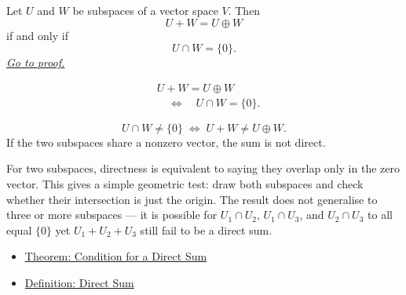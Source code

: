 
\begin{tcolorbox}[colback=thmbox, colframe=thmborder, arc=2pt,
  left=6pt, right=6pt, top=4pt, bottom=4pt,
  title={\small\textbf{Theorem (Direct Sum of Two Subspaces)}},
  fonttitle=\small\bfseries]
\begin{theorem}
\label{thm:direct-sum-of-two-subspaces}
Let $U$ and $W$ be subspaces of a vector space $V$.
Then
\[
U+W=U\oplus W
\]
if and only if
\[
U \cap W = \{0\}.
\]
\hyperref[prf:direct-sum-of-two-subspaces]{\textit{Go to proof.}}
\end{theorem}
\end{tcolorbox}

\begin{remark*}
\[
\begin{aligned}
&U+W=U\oplus W \\
&\quad\Longleftrightarrow\quad
U \cap W = \{0\}.
\end{aligned}
\]
\end{remark*}

\begin{remark*}
\[
U \cap W \neq \{0\}
\;\Longleftrightarrow\;
U + W \neq U \oplus W.
\]
If the two subspaces share a nonzero vector, the sum is not direct.
\end{remark*}

\begin{remark*}[Interpretation]
For two subspaces, directness is equivalent to saying they overlap only
in the zero vector. This gives a simple geometric test: draw both subspaces
and check whether their intersection is just the origin. The result does not
generalise to three or more subspaces --- it is possible for $U_1\cap U_2$,
$U_1\cap U_3$, and $U_2\cap U_3$ to all equal $\{0\}$ yet $U_1+U_2+U_3$
still fail to be a direct sum.
\end{remark*}

\begin{remark*}[Dependencies]
\begin{itemize}
  \item \hyperref[thm:condition-for-direct-sum]{Theorem: Condition for a Direct Sum}
  \item \hyperref[def:direct-sum]{Definition: Direct Sum}
\end{itemize}
\end{remark*}

